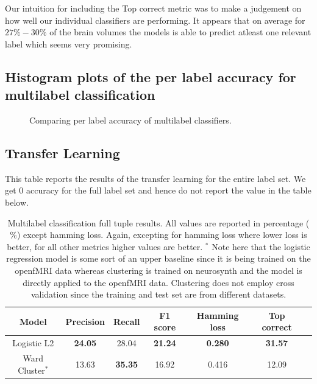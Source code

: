 \documentclass{article} %
\begin{document}
Our intuition for including the Top correct metric was to make a judgement on how well our individual classifiers are performing. It appears that on average for $27\%-30\%$ of the brain volumes the models is able to predict atleast one relevant label which seems very promising.

\subsection{Histogram plots of the per label accuracy for multilabel classification}
\begin{figure}[!hbt]
\vspace{-0.5cm}
\centering
{} 
\caption{Comparing per label accuracy of multilabel classifiers.}
\label{fig:perlab}
\end{figure}


 \subsection{Transfer Learning}
This table reports the results of the transfer learning for the entire label set. We get 0 accuracy for the full label set and hence do not report the value in the table below.
\begin{table}[h]
\begin{center}
\begin{tabular}{|c|c|c|c|c|c|c|}
\hline
 Model           & Precision & Recall    & F1 score  & Hamming loss & Top correct\\ \hline
 Logistic L2     & \bf{24.05}& 28.04     & \bf{21.24}& \bf{0.280}   & \bf{31.57} \\ \hline
 Ward Cluster$^*$& 13.63     & \bf{35.35}& 16.92     & 0.416        & 12.09      \\ \hline
\end{tabular}
\caption{Multilabel classification full tuple results. All values are reported in percentage ($\%$) except hamming loss. Again, excepting for hamming loss where lower loss is better, for all other metrics higher values are better. $^*$ Note here that the logistic regression model is some sort of an upper baseline since it is being trained on the openfMRI data whereas clustering is trained on neurosynth and the model is directly applied to the openfMRI data. Clustering does not employ cross validation since the training and test set are from different datasets.}
\end{center}
\end{table}
\end{document}
